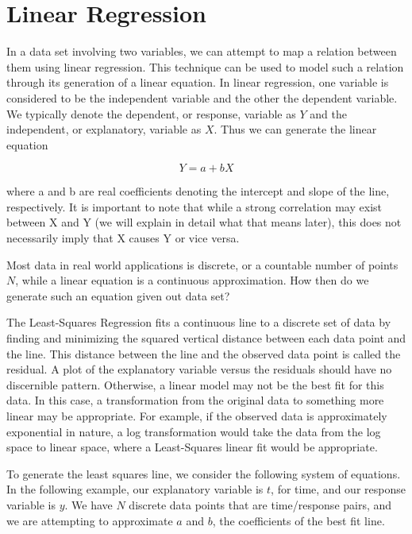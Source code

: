 \section{Linear Regression}

In a data set involving two variables, we can attempt to map a relation between them using linear regression. This technique can be used to model such a relation through its generation of a linear equation. In linear regression, one variable is considered to be the independent variable and the other the dependent variable. We typically denote the dependent, or response, variable as $Y$ and the independent, or explanatory, variable as $X$. Thus we can generate the linear equation

\begin{equation}
    Y=a+bX
\end{equation}

where a and b are real coefficients denoting the intercept and slope of the line, respectively. It is important to note that while a strong correlation may exist between X and Y (we will explain in detail what that means later), this does not necessarily imply that X causes Y or vice versa. \newline


Most data in real world applications is discrete, or a countable number of points $N$, while a linear equation is a continuous approximation. How then do we generate such an equation given out data set?

The Least-Squares Regression fits a continuous line to a discrete set of data by finding and minimizing the squared vertical distance between each data point and the line. This distance between the line and the observed data point is called the residual. A plot of the explanatory variable versus the residuals should have no discernible pattern. Otherwise, a linear model may not be the best fit for this data. In this case, a transformation from the original data to something more linear may be appropriate. For example, if the observed data is approximately exponential in nature, a log transformation would take the data from the log space to linear space, where a Least-Squares linear fit would be appropriate. \newline

To generate the least squares line, we consider the following system of equations. In the following example, our explanatory variable is $t$, for time, and our response variable is $y$. We have $N$ discrete data points that are time/response pairs, and we are attempting to approximate $a$ and $b$, the coefficients of the best fit line. 

